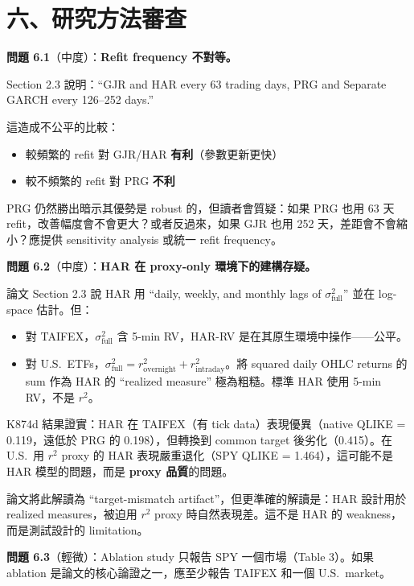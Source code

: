 \documentclass[12pt,a4paper]{article}
\begin{document}
\section{六、研究方法審查}

\textbf{問題 6.1}（\textcolor{warncolor}{中度}）：\textbf{Refit frequency 不對等。}

Section 2.3 說明：``GJR and HAR every 63 trading days, PRG and Separate GARCH every 126--252 days.''

這造成不公平的比較：
\begin{itemize}
    \item 較頻繁的 refit 對 GJR/HAR \textbf{有利}（參數更新更快）
    \item 較不頻繁的 refit 對 PRG \textbf{不利}
\end{itemize}

PRG 仍然勝出暗示其優勢是 robust 的，但讀者會質疑：如果 PRG 也用 63 天 refit，改善幅度會不會更大？或者反過來，如果 GJR 也用 252 天，差距會不會縮小？應提供 sensitivity analysis 或統一 refit frequency。

\textbf{問題 6.2}（\textcolor{warncolor}{中度}）：\textbf{HAR 在 proxy-only 環境下的建構存疑。}

論文 Section 2.3 說 HAR 用 ``daily, weekly, and monthly lags of $\sigma^2_\text{full}$'' 並在 log-space 估計。但：
\begin{itemize}
    \item 對 TAIFEX，$\sigma^2_\text{full}$ 含 5-min RV，HAR-RV 是在其原生環境中操作——公平。
    \item 對 U.S.\ ETFs，$\sigma^2_\text{full} = r^2_\text{overnight} + r^2_\text{intraday}$。將 squared daily OHLC returns 的 sum 作為 HAR 的 ``realized measure'' 極為粗糙。標準 HAR 使用 5-min RV，不是 $r^2$。
\end{itemize}

K874d 結果證實：HAR 在 TAIFEX（有 tick data）表現優異（native QLIKE = 0.119，遠低於 PRG 的 0.198），但轉換到 common target 後劣化（0.415）。在 U.S.\ 用 $r^2$ proxy 的 HAR 表現嚴重退化（SPY QLIKE = 1.464），這可能不是 HAR 模型的問題，而是 \textbf{proxy 品質}的問題。

論文將此解讀為 ``target-mismatch artifact''，但更準確的解讀是：HAR 設計用於 realized measures，被迫用 $r^2$ proxy 時自然表現差。這不是 HAR 的 weakness，而是測試設計的 limitation。

\textbf{問題 6.3}（輕微）：Ablation study 只報告 SPY 一個市場（Table 3）。如果 ablation 是論文的核心論證之一，應至少報告 TAIFEX 和一個 U.S.\ market。
\end{document}
